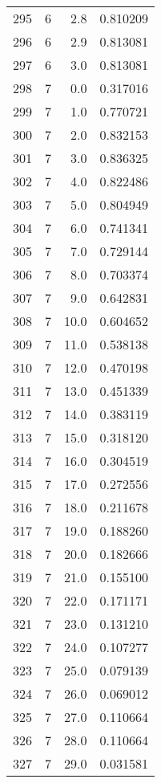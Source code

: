 \begin{tabular}{lrrr}
295 &        6 &      2.8 &  0.810209 \\
296 &        6 &      2.9 &  0.813081 \\
297 &        6 &      3.0 &  0.813081 \\
298 &        7 &      0.0 &  0.317016 \\
299 &        7 &      1.0 &  0.770721 \\
300 &        7 &      2.0 &  0.832153 \\
301 &        7 &      3.0 &  0.836325 \\
302 &        7 &      4.0 &  0.822486 \\
303 &        7 &      5.0 &  0.804949 \\
304 &        7 &      6.0 &  0.741341 \\
305 &        7 &      7.0 &  0.729144 \\
306 &        7 &      8.0 &  0.703374 \\
307 &        7 &      9.0 &  0.642831 \\
308 &        7 &     10.0 &  0.604652 \\
309 &        7 &     11.0 &  0.538138 \\
310 &        7 &     12.0 &  0.470198 \\
311 &        7 &     13.0 &  0.451339 \\
312 &        7 &     14.0 &  0.383119 \\
313 &        7 &     15.0 &  0.318120 \\
314 &        7 &     16.0 &  0.304519 \\
315 &        7 &     17.0 &  0.272556 \\
316 &        7 &     18.0 &  0.211678 \\
317 &        7 &     19.0 &  0.188260 \\
318 &        7 &     20.0 &  0.182666 \\
319 &        7 &     21.0 &  0.155100 \\
320 &        7 &     22.0 &  0.171171 \\
321 &        7 &     23.0 &  0.131210 \\
322 &        7 &     24.0 &  0.107277 \\
323 &        7 &     25.0 &  0.079139 \\
324 &        7 &     26.0 &  0.069012 \\
325 &        7 &     27.0 &  0.110664 \\
326 &        7 &     28.0 &  0.110664 \\
327 &        7 &     29.0 &  0.031581 \\

\end{tabular}
